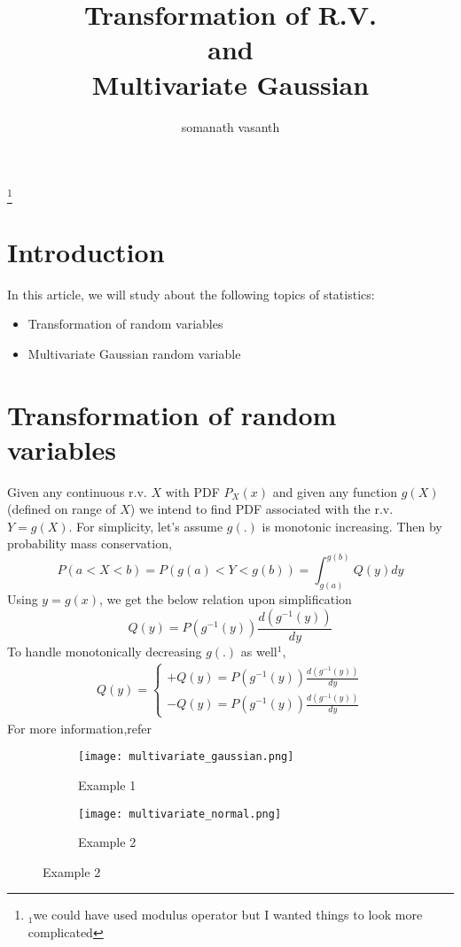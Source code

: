 \documentclass{article}
\begin{document}
\title{Transformation of R.V. \\
and \\
Multivariate Gaussian \\}
\author{somanath vasanth}

\maketitle


\tableofcontents

\clearpage
\footnote{$_1$we could have used modulus operator but I wanted things to look more complicated
}
\thispagestyle{fancy}
\fancyhf{}
\section{Introduction}\label{1}
In this article, we will study about the following topics of statistics:
\begin{itemize}

\item  Transformation of random variables
\item  Multivariate Gaussian random variable
\end{itemize}
\section{Transformation of random variables}
Given any continuous r.v. $X$ with PDF $P_X(x)$ and given any function $g(X)$(defined on range of
$X$) we intend to find PDF associated with the r.v. $Y = g(X)$.
For simplicity, let’s assume $g(.)$ is monotonic increasing.
Then by probability mass conservation,
\[
P(a<X<b)=P(g(a)<Y<g(b))=\int_{g(a)}^{g(b)}Q(y)dy
\]
Using $y = g(x)$, we get the below relation upon simplification
\[
Q(y)=P(g^{-1}(y))\frac{d(g^{-1}(y))}{dy}
\]
To handle monotonically decreasing $g(.)$ as well$^1$,
\begin{equation}
\begin{aligned}
Q(y)=\begin{cases}
+Q(y)=P(g^{-1}(y))\frac{d(g^{-1}(y))}{dy}\\
-Q(y)=P(g^{-1}(y))\frac{d(g^{-1}(y))}{dy}
\end{cases}
\end{aligned}
\end{equation}
For more information,refer\cite{1} 
 \begin{figure}[h!]
 \begin{subfigure}[B]{0.3\textwidth}
\texttt{[image: multivariate\_gaussian.png]}
\caption{Example 1}
\label{fig1}
\end{subfigure}
\begin{subfigure}[B]{0.3\textwidth}
\texttt{[image: multivariate\_normal.png]}
 \caption{Example 2}
 \label{fig2}
 \end{subfigure}
 \end{figure}
\end{document}
